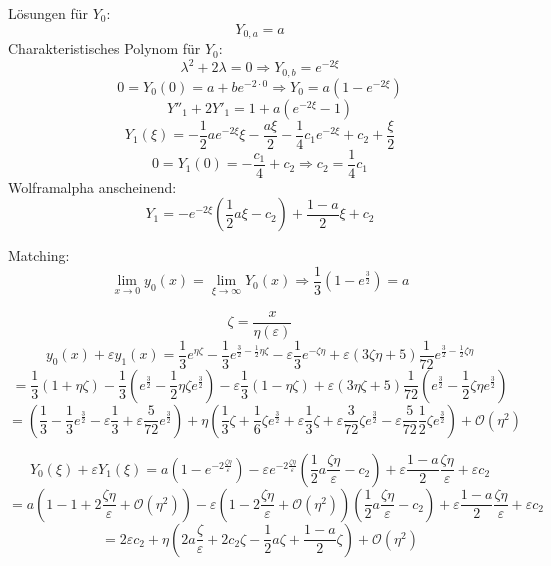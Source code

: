 \documentclass[a4paper,11pt]{scrartcl}
\newcommand*{\eps}{\varepsilon}
\newcommand*{\Ld}{\mathcal{O}}
\begin{document}
\begin{enumerate}[label*=\textbf{8.\arabic*.}]
\begin{enumerate}
    Lösungen für $Y_0$:
    \[ Y_{0, a} = a\]
    Charakteristisches Polynom für $Y_0$:
    \[\lambda^2 + 2 \lambda = 0 \Rightarrow Y_{0, b} = e^{-2\xi}\]
    \[0 = Y_0(0) = a + b e^{-2 \cdot 0} \Rightarrow Y_0 = a (1 - e^{-2\xi}) \]
    \[Y''_1 + 2 Y'_1 = 1 + a (e^{-2 \xi} - 1)\]
    \[Y_1(\xi) = -\frac{1}{2} a e^{-2\xi} \xi - \frac{a\xi}{2} -\frac{1}{4} c_1
      e^{-2 \xi} + c_2 + \frac{\xi}{2} \]
    \[0= Y_1(0) = -\frac{c_1}{4} + c_2 \Rightarrow c_2 = \frac{1}{4} c_1\]
    Wolframalpha anscheinend:
    \[Y_1 = -e^{-2\xi} \left(\frac{1}{2}a \xi - c_2\right) + \frac{1-a}{2} \xi
      + c_2\]

    Matching:
    \[\lim_{x\rightarrow 0} y_0(x) = \lim_{\xi \rightarrow \infty} Y_0(x)
      \Rightarrow \frac{1}{3}( 1 -e^{\frac{3}{2}}) = a\]

    \[\zeta = \frac{x}{\eta(\eps)}\]
    \[y_0(x) + \eps y_1(x) = \frac{1}{3} e^{\eta\zeta} - \frac{1}{3}
      e^{\frac{3}{2} - \frac{1}{2}\eta\zeta} - \eps \frac{1}{3} e^{-\zeta
        \eta}+ \eps(3 \zeta \eta + 5) \frac{1}{72} e^{\frac{3}{2} - \frac{1}{2}
        \zeta \eta}\]
    \[ = \frac{1}{3} (1 + \eta \zeta) - \frac{1}{3} (e^{\frac{3}{2}}
      -\frac{1}{2} \eta \zeta e^{\frac{3}{2}}) - \eps \frac{1}{3} (1 - \eta
      \zeta) + \eps (3 \eta \zeta + 5) \frac{1}{72} (e^{\frac{3}{2}}
      -\frac{1}{2} \zeta \eta e^{\frac{3}{2}}) \]
    \[= \left(\frac{1}{3} -\frac{1}{3} e^{\frac{3}{2}} - \eps \frac{1}{3} + \eps
        \frac{5}{72} e^{\frac{3}{2}}\right)
    + \eta\left( \frac{1}{3} \zeta + \frac{1}{6} \zeta
        e^{\frac{3}{2}} + \eps \frac{1}{3} \zeta + \eps \frac{3}{72} \zeta
        e^{\frac{3}{2}} - \eps \frac{5}{72} \frac{1}{2}\zeta e^{\frac{3}{2}}
      \right) + \Ld(\eta^2) \]

    \[Y_0(\xi)+\eps Y_1(\xi) = a (1 - e^{-2 \frac{\zeta \eta}{\eps}}) - \eps
      e^{-2\frac{\zeta \eta}{\eps}} \left( \frac{1}{2} a \frac{\zeta \eta}{\eps}
      - c_2 \right) + \eps \frac{1 - a}{2}\frac{\zeta\eta}{\eps} + \eps c_2   \]
    \[ = a (1 - 1 + 2 \frac{\zeta \eta}{\eps} + \Ld(\eta^2)) - \eps
      (1 - 2\frac{\zeta \eta}{\eps} + \Ld(\eta^2)) \left( \frac{1}{2} a \frac{\zeta \eta}{\eps}
      - c_2 \right) + \eps \frac{1 - a}{2}\frac{\zeta\eta}{\eps} + \eps c_2   \]
  \[ = 2\eps c_2 + \eta \left( 2 a\frac{\zeta}{\eps} + 2 c_2 \zeta - \frac{1}{2}
    a \zeta + \frac{1-a}{2}\zeta\right) + \Ld(\eta^2)\]





\end{enumerate}
\end{enumerate}
\end{document}

